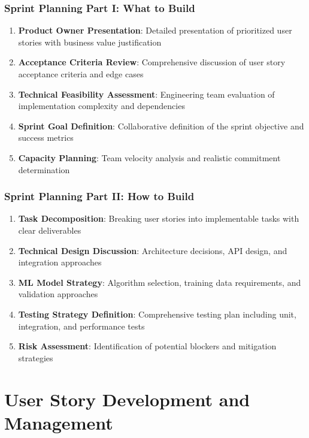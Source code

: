 \subsubsection{Sprint Planning Part I: What to Build}

\begin{enumerate}[leftmargin=*]
    \item \textbf{Product Owner Presentation}: Detailed presentation of prioritized user stories with business value justification
    \item \textbf{Acceptance Criteria Review}: Comprehensive discussion of user story acceptance criteria and edge cases
    \item \textbf{Technical Feasibility Assessment}: Engineering team evaluation of implementation complexity and dependencies
    \item \textbf{Sprint Goal Definition}: Collaborative definition of the sprint objective and success metrics
    \item \textbf{Capacity Planning}: Team velocity analysis and realistic commitment determination
\end{enumerate}

\subsubsection{Sprint Planning Part II: How to Build}

\begin{enumerate}[leftmargin=*]
    \item \textbf{Task Decomposition}: Breaking user stories into implementable tasks with clear deliverables
    \item \textbf{Technical Design Discussion}: Architecture decisions, API design, and integration approaches
    \item \textbf{ML Model Strategy}: Algorithm selection, training data requirements, and validation approaches
    \item \textbf{Testing Strategy Definition}: Comprehensive testing plan including unit, integration, and performance tests
    \item \textbf{Risk Assessment}: Identification of potential blockers and mitigation strategies
\end{enumerate}

\section{User Story Development and Management}

